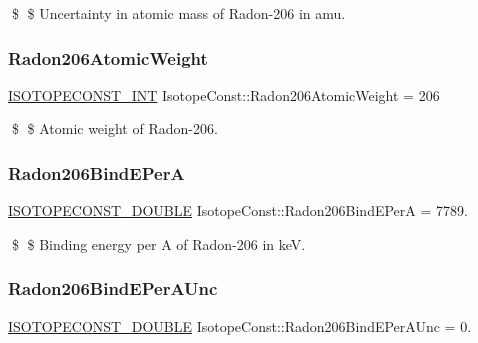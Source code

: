 \$ \$ Uncertainty in atomic mass of Radon-\/206 in amu. \mbox{\label{group___isotope_const-_radon-_rn206_gafbe081794861c2b20da89e9e80604460}} 
\subsubsection{\texorpdfstring{Radon206\+Atomic\+Weight}{Radon206AtomicWeight}}
{\footnotesize\ttfamily \mbox{\hyperlink{group___isotope_const-_macros_ga5f18360b3e99483a35c32d789e62621c}{I\+S\+O\+T\+O\+P\+E\+C\+O\+N\+S\+T\+\_\+\+I\+NT}} Isotope\+Const\+::\+Radon206\+Atomic\+Weight = 206}

\$ \$ Atomic weight of Radon-\/206. \mbox{\label{group___isotope_const-_radon-_rn206_gaefa1b4e36f5ec61c25be4b5dcdbc31e9}} 
\subsubsection{\texorpdfstring{Radon206\+Bind\+E\+PerA}{Radon206BindEPerA}}
{\footnotesize\ttfamily \mbox{\hyperlink{group___isotope_const-_macros_ga8f45a7272ce02c0b4c65c44636ed719a}{I\+S\+O\+T\+O\+P\+E\+C\+O\+N\+S\+T\+\_\+\+D\+O\+U\+B\+LE}} Isotope\+Const\+::\+Radon206\+Bind\+E\+PerA = 7789.}

\$ \$ Binding energy per A of Radon-\/206 in keV. \mbox{\label{group___isotope_const-_radon-_rn206_ga8de55ccff492df2407c589df7fe52274}} 
\subsubsection{\texorpdfstring{Radon206\+Bind\+E\+Per\+A\+Unc}{Radon206BindEPerAUnc}}
{\footnotesize\ttfamily \mbox{\hyperlink{group___isotope_const-_macros_ga8f45a7272ce02c0b4c65c44636ed719a}{I\+S\+O\+T\+O\+P\+E\+C\+O\+N\+S\+T\+\_\+\+D\+O\+U\+B\+LE}} Isotope\+Const\+::\+Radon206\+Bind\+E\+Per\+A\+Unc = 0.}

